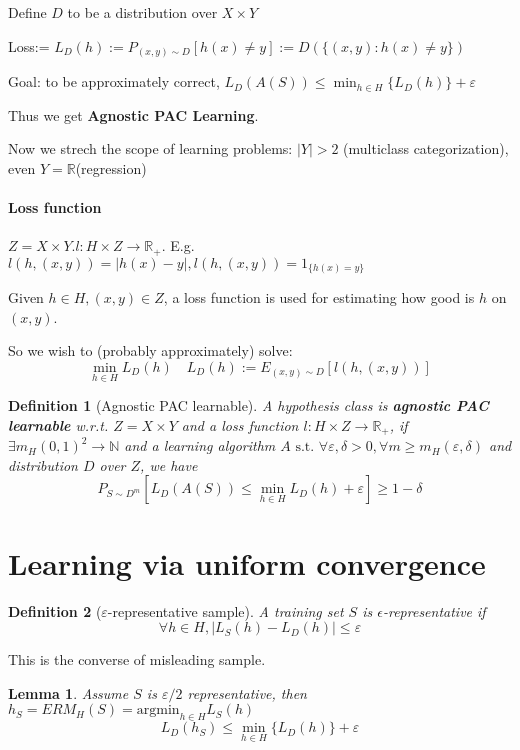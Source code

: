 \documentclass{book}
\newcommand{\R}{\mathbb{R}}
\newcommand{\st}{\text{ s.t. }}
\newtheorem{Lemma}[Thm]{Lemma}
\newtheorem{Def}{Definition}[section]
\begin{document}
Define $D$ to be a distribution over $X\times Y$

Loss:= $L_{D}(h):=P_{(x,y)\sim D}[h(x)\neq y]:=D(\{(x,y):h(x)\neq y\})$

Goal: to be approximately correct, $L_{D}(A(S))\leq \min_{h\in H}\{L_{D}(h)\}+\varepsilon$

Thus we get \textbf{Agnostic PAC Learning}.

Now we strech the scope of learning problems: $|Y|>2$ (multiclass categorization), even $Y=\R$(regression)

\paragraph{Loss function}
$Z=X\times Y. l:H\times Z\to \R_{+}$. E.g. $l(h,(x,y))=|h(x)-y|, l(h,(x,y))=1_{\{h(x)=y\}}$

Given $h\in H, (x,y)\in Z$, a loss function is used for estimating how good is $h$ on $(x,y)$.

So we wish to (probably approximately) solve:
\[\min_{h\in H}L_{D}(h)\quad L_{D}(h):=E_{(x,y)\sim D}[l(h,(x,y))]\]

\begin{Def}[Agnostic PAC learnable]
  A hypothesis class is \textbf{agnostic PAC learnable} w.r.t. $Z=X\times Y$ and a loss function $l:H\times Z\to \R_{+}$, if $\exists m_{H}(0,1)^{2}\to\mathbb{N}$ and a learning algorithm $A\st \forall \varepsilon,\delta>0,\forall m\geq m_{H}(\varepsilon,\delta)$ and distribution $D$ over $Z$, we have
  \[P_{S\sim D^{m}}[L_{D}(A(S))\leq\min_{h\in H}L_{D}(h)+\varepsilon]\geq 1-\delta\]
\end{Def}

\section{Learning via uniform convergence}
\begin{Def}[$\varepsilon$-representative sample]
  A training set $S$ is $\epsilon$-representative if
  \[\forall h\in H,|L_{S}(h)-L_{D}(h)|\leq \varepsilon\]
\end{Def}

This is the converse of misleading sample.

\begin{Lemma}
  Assume $S$ is $\varepsilon/2$ representative, then $h_{S}=ERM_{H}(S)=\mathrm{argmin}_{h\in H}L_{S}(h)$
  \[L_{D}(h_{S})\leq \min_{h\in H}\{L_{D}(h)\}+\varepsilon\]
\end{Lemma}
\end{document}
